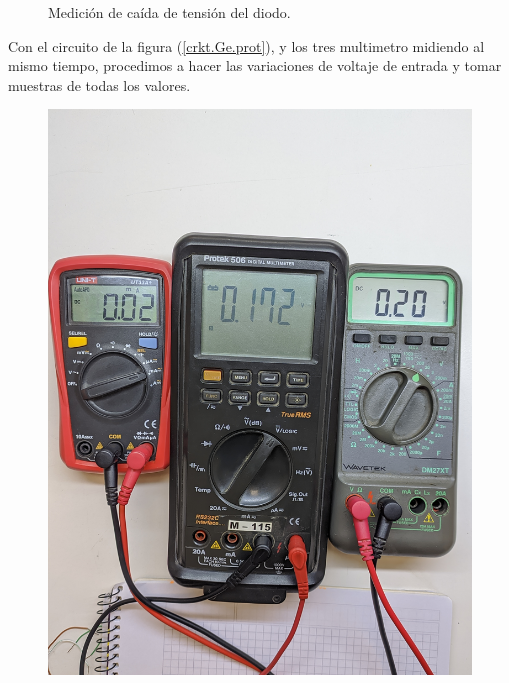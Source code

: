 \documentclass[chaptersright]{informeutn}
\begin{document}
\begin{figure}[H]
\begin{minipage}{0.3\textwidth}
          \caption{Medición de caída de tensión del diodo.}
          \label{crkt.Ge.mult.vd}
        \end{minipage}
      \end{figure}

      Con el circuito de la figura (\ref{crkt.Ge.prot}), y los tres multimetro midiendo al mismo tiempo, procedimos a
      hacer las variaciones de voltaje de entrada y tomar muestras de todas los valores.

      \begin{figure}[!ht]
        \centering
        \begin{minipage}{0.25\textwidth}
          \includegraphics[width=1\textwidth]{pictures/mult_crkt-2_03.jpg}
        \end{minipage}
        \begin{minipage}{0.25\textwidth}

\end{minipage}
\end{figure}
\end{document}
